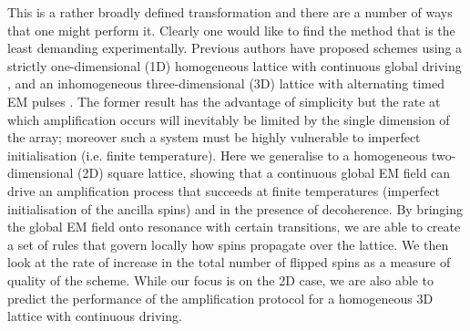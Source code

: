   This is a rather broadly defined transformation and there are a number of ways that one might perform it. Clearly one would like to find the method that is the least demanding experimentally. Previous authors have proposed schemes using a strictly one-dimensional (1D) homogeneous lattice with continuous global driving \cite{Lee:2005p6468}, and an inhomogeneous three-dimensional (3D) lattice with alternating timed EM pulses \cite{PerezDelgado:2006p6542}. The former result has the advantage of simplicity but the rate at which amplification occurs will inevitably be limited by the single dimension of the array; moreover such a system must be highly vulnerable to imperfect initialisation (i.e. finite temperature). Here we generalise to a homogeneous two-dimensional (2D) square lattice, showing that a continuous global EM field can drive an amplification process that succeeds at finite temperatures (imperfect initialisation of the ancilla spins) and in the presence of decoherence. By bringing the global EM field onto resonance with certain transitions, we are able to create a set of rules that govern locally how spins propagate over the lattice. We then look at the rate of increase in the total number of flipped spins as a measure of quality of the scheme. While our focus is on the 2D case, we are also able to predict the performance of the amplification protocol for a homogeneous 3D lattice with continuous driving.


